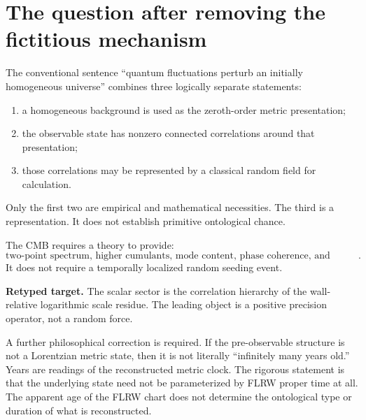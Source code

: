 \documentclass[11pt]{article}
\numberwithin{equation}{section}
\begin{document}
\begin{abstract}
The construction closes the conceptual scalar target: no random kick, inflaton potential, or arbitrary primordial feature function is needed. The remaining microscopic task is to identify the wall QFT or algebraic state whose stress-trace spectral density has the measured normalization and slow running, and then compute its tensor and higher-point spectral functions.
\end{abstract}

\tableofcontents
\clearpage

\section{The question after removing the fictitious mechanism}

The conventional sentence ``quantum fluctuations perturb an initially homogeneous universe'' combines three logically separate statements:
\begin{enumerate}
\item a homogeneous background is used as the zeroth-order metric presentation;
\item the observable state has nonzero connected correlations around that presentation;
\item those correlations may be represented by a classical random field for calculation.
\end{enumerate}
Only the first two are empirical and mathematical necessities. The third is a representation. It does not establish primitive ontological chance.

The CMB requires a theory to provide:
\begin{equation}
\boxed{
\text{two-point spectrum, higher cumulants, mode content, phase coherence, and transfer laws}.}
\end{equation}
It does not require a temporally localized random seeding event.

\begin{thesisbox}
\textbf{Retyped target.} The scalar sector is the correlation hierarchy of the wall-relative logarithmic scale residue. The leading object is a positive precision operator, not a random force.
\end{thesisbox}

A further philosophical correction is required. If the pre-observable structure is not a Lorentzian metric state, then it is not literally ``infinitely many years old.'' Years are readings of the reconstructed metric clock. The rigorous statement is that the underlying state need not be parameterized by FLRW proper time at all. The apparent age of the FLRW chart does not determine the ontological type or duration of what is reconstructed.
\end{document}
